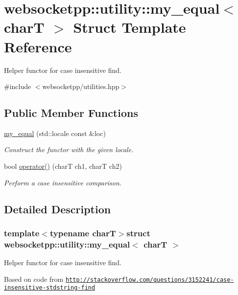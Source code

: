 \hypertarget{structwebsocketpp_1_1utility_1_1my__equal}{}\section{websocketpp\+:\+:utility\+:\+:my\+\_\+equal$<$ char\+T $>$ Struct Template Reference}
\label{structwebsocketpp_1_1utility_1_1my__equal}


Helper functor for case insensitive find.  




{\ttfamily \#include $<$websocketpp/utilities.\+hpp$>$}

\subsection*{Public Member Functions}
\begin{DoxyCompactItemize}
\item 
\hyperlink{structwebsocketpp_1_1utility_1_1my__equal_a8f03de886784304ffd39ed5de677af1f}{my\+\_\+equal} (std\+::locale const \&loc)
\begin{DoxyCompactList}\small\item\em Construct the functor with the given locale. \end{DoxyCompactList}\item 
bool \hyperlink{structwebsocketpp_1_1utility_1_1my__equal_a06b93db62003458703574e6421f9875f}{operator()} (char\+T ch1, char\+T ch2)
\begin{DoxyCompactList}\small\item\em Perform a case insensitive comparison. \end{DoxyCompactList}\end{DoxyCompactItemize}


\subsection{Detailed Description}
\subsubsection*{template$<$typename char\+T$>$struct websocketpp\+::utility\+::my\+\_\+equal$<$ char\+T $>$}

Helper functor for case insensitive find. 

Based on code from \href{http://stackoverflow.com/questions/3152241/case-insensitive-stdstring-find}{\tt http\+://stackoverflow.\+com/questions/3152241/case-\/insensitive-\/stdstring-\/find}

